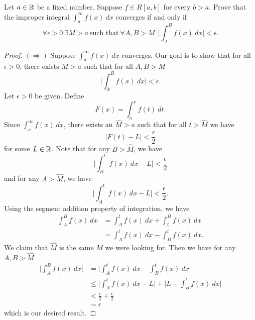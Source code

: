 \documentclass[a4paper]{article}
\begin{document}
\begin{problem}
    Let \( a \in \mathbb{R}  \) be a fixed number. Suppose \( f \in R[a,b] \) for every \( b > a  \). Prove that the improper integral \( \displaystyle \int_{ a }^{ \infty  }  f(x) \ dx  \) converges if and only if  
    \[  \forall \epsilon > 0 \ \exists M > a \ \text{such that} \ \forall A,B > M \ \ \Big|  \int_{ A }^{ B }  f(x) \ dx  \Big| < \epsilon.  \]
\end{problem}
\begin{proof}
\( (\Longrightarrow) \) Suppose \( \int_{ a }^{ \infty  } f(x) \ dx   \) converges. Our goal is to show that for all \( \epsilon > 0  \), there exists \( M > a  \) such that for all \( A,B > M  \)
\[  \Big|  \int_{ A }^{B }  f(x) \ dx  \Big|  < \epsilon. \]
Let \( \epsilon > 0  \) be given. Define 
\[  F(x) = \int_{ a }^{ x }  f(t) \ dt.  \]
Since \( \int_{ a }^{ \infty  }  f(x) \ dx  \), there exists an \( \hat{M} > a  \) such that for all \( t > \hat{M} \) we have   
\[  | F(t) - L  | < \frac{ \epsilon }{ 2 }  \]
for some \( L \in \mathbb{R}    \). Note that for any \( B > \hat{M} \), we have
\[  \Big|  \int_{ B }^{ t }  f(x) \ dx - L  \Big| < \frac{ \epsilon }{ 2 } \]
and for any \( A > \hat{M} \), we have 
\[  \Big| \int_{  A  }^{ t } f(x) \ dx - L  \Big| < \frac{ \epsilon }{ 2 }. \]
Using the segment addition property of integration, we have 
\begin{align*}
    \int_{ A }^{ B }  f(x)  \ dx &= \int_{ A  }^{ t  }  f(x) \ dx + \int_{ t  }^{ B  }  f(x) \ dx  \\
                                 &= \int_{ A }^{ t }  f(x) \ dx - \int_{ B }^{ t } f(x) \ dx.
\end{align*}
We claim that \( \hat{M} \) is the same \( M  \) we were looking for. Then we have for any \( A, B > \hat{M} \)
\begin{align*}
    \Big| \int_{ A }^{ B } f(x) \ dx   \Big| &= \Big| \int_{ A  }^{ t  }  f(x) \ dx - \int_{ B }^{ t  }  f(x) \ dx  \Big|  \\
                                             &\leq \Big| \int_{ A }^{ t }  f(x) \ dx - L  \Big|  + \Big| L - \int_{ B }^{ t } f(x) \ dx \Big|  \\
                                             &< \frac{ \epsilon }{ 2 }  + \frac{ \epsilon }{ 2 } \\
                                             &= \epsilon
\end{align*}
which is our desired result.


\end{proof}
\end{document}
